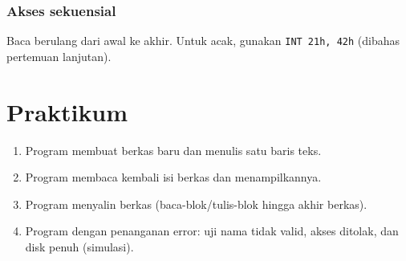 \subsubsection{Akses sekuensial}
Baca berulang dari awal ke akhir. Untuk acak, gunakan \texttt{INT 21h, 42h} (dibahas pertemuan lanjutan).

\section{Praktikum}
\begin{enumerate}
  \item Program membuat berkas baru dan menulis satu baris teks.
  \item Program membaca kembali isi berkas dan menampilkannya.
  \item Program menyalin berkas (baca-blok/tulis-blok hingga akhir berkas).
  \item Program dengan penanganan error: uji nama tidak valid, akses ditolak, dan disk penuh (simulasi).
\end{enumerate}

